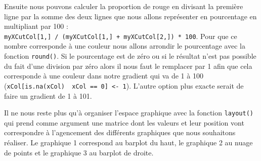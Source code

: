 \documentclass[twoside,symmetric]{book}
\begin{document}
Ensuite nous pouvons calculer la proportion de rouge en divisant la première ligne par la somme des deux lignes que nous allons représenter en pourcentage en multipliant par 100 : \texttt{myXCutCol{[}1,{]}\ /\ (myXCutCol{[}1,{]}\ +\ myXCutCol{[}2,{]})\ *\ 100}. Pour que ce nombre corresponde à une couleur nous allons arrondir le pourcentage avec la fonction \texttt{round()}. Si le pourcentage est de zéro ou si le résultat n'est pas possible du fait d'une division par zéro alors il nous faut le remplacer par 1 afin que cela corresponde à une couleur dans notre gradient qui va de 1 à 100 (\texttt{xCol{[}is.na(xCol)\ \textbar{}\ xCol\ ==\ 0{]}\ \textless{}-\ 1}). L'autre option plus exacte serait de faire un gradient de 1 à 101.

Il ne nous reste plus qu'à organiser l'espace graphique avec la fonction \texttt{layout()} qui prend comme argument une matrice dont les valeurs et leur position vont correspondre à l'agencement des différents graphiques que nous souhaitons réaliser. Le graphique 1 correspond au barplot du haut, le graphique 2 au nuage de points et le graphique 3 au barplot de droite.
\end{document}
